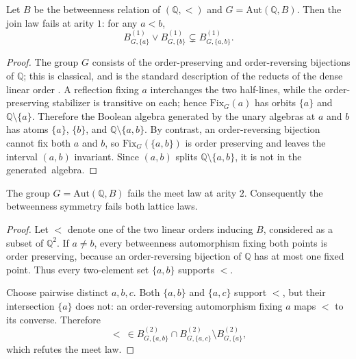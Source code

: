 \documentclass{lmcs}
\newcommand{\Fix}{\mathrm{Fix}}
\newcommand{\Aut}{\mathrm{Aut}}
\begin{document}
\begin{thm}
\label{thm:betwfail}
Let $B$ be the betweenness relation of $(\mathbb Q,<)$ and
$G=\Aut(\mathbb Q,B)$. Then the join law fails at arity $1$: for any
$a<b$,
\[
B^{(1)}_{G,\{a\}}\vee B^{(1)}_{G,\{b\}}
\subsetneq B^{(1)}_{G,\{a,b\}}.
\]
\end{thm}
\begin{proof}
The group $G$ consists of the order-preserving and order-reversing
bijections of $\mathbb Q$; this is classical, and is the standard
description of the reducts of the dense linear order
\cite{Cameron76}. A reflection fixing
$a$ interchanges the two half-lines, while the order-preserving
stabilizer is transitive on each; hence $\Fix_G(a)$ has orbits
$\{a\}$ and $\mathbb Q\setminus\{a\}$. Therefore the Boolean algebra
generated by the unary algebras at $a$ and $b$ has atoms
$\{a\}$, $\{b\}$, and $\mathbb Q\setminus\{a,b\}$. By contrast, an
order-reversing bijection cannot fix both $a$ and $b$, so
$\Fix_G(\{a,b\})$ is order preserving and leaves the interval $(a,b)$
invariant. Since $(a,b)$ splits
$\mathbb Q\setminus\{a,b\}$, it is not in the generated~algebra.
\end{proof}

\begin{prop}
\label{prop:betwmeetfail}
The group $G=\Aut(\mathbb Q,B)$ fails the meet law at arity $2$.
Consequently the betweenness symmetry fails both lattice laws.
\end{prop}

\begin{proof}
Let $<$ denote one of the two linear orders inducing $B$, considered as
a subset of $\mathbb Q^2$. If $a\neq b$, every betweenness
automorphism fixing both points is order preserving, because an
order-reversing bijection of $\mathbb Q$ has at most one fixed point.
Thus every two-element set $\{a,b\}$ supports $<$.

Choose pairwise distinct $a,b,c$. Both $\{a,b\}$ and $\{a,c\}$
support $<$, but their intersection $\{a\}$ does not: an
order-reversing automorphism fixing $a$ maps $<$ to its converse.
Therefore
\[
 {<}\ \in B^{(2)}_{G,\{a,b\}}\cap B^{(2)}_{G,\{a,c\}}
 \setminus B^{(2)}_{G,\{a\}},
\]
which refutes the meet law.
\end{proof}
\end{document}
